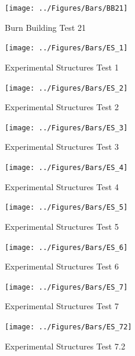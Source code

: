 \documentclass[12pt,oneside]{book}
\begin{document}
\begin{figure}[!ht]
	\texttt{[image: ../Figures/Bars/BB21]}
	\caption{Burn Building Test 21}
	\label{fig:Burn_Building_Test_21}
\end{figure}

\begin{figure}[!ht]
	\texttt{[image: ../Figures/Bars/ES\_1]}
	\caption{Experimental Structures Test 1}
	\label{fig:Experimental_Structures_Test_1}
\end{figure}

\clearpage

\begin{figure}[!ht]
	\texttt{[image: ../Figures/Bars/ES\_2]}
	\caption{Experimental Structures Test 2}
	\label{fig:Experimental_Structures_Test_2}
\end{figure}

\begin{figure}[!ht]
	\texttt{[image: ../Figures/Bars/ES\_3]}
	\caption{Experimental Structures Test 3}
	\label{fig:Experimental_Structures_Test_3}
\end{figure}

\begin{figure}[!ht]
	\texttt{[image: ../Figures/Bars/ES\_4]}
	\caption{Experimental Structures Test 4}
	\label{fig:Experimental_Structures_Test_4}
\end{figure}

\begin{figure}[!ht]
	\texttt{[image: ../Figures/Bars/ES\_5]}
	\caption{Experimental Structures Test 5}
	\label{fig:Experimental_Structures_Test_5}
\end{figure}

\clearpage

\begin{figure}[!ht]
	\texttt{[image: ../Figures/Bars/ES\_6]}
	\caption{Experimental Structures Test 6}
	\label{fig:Experimental_Structures_Test_6}
\end{figure}

\begin{figure}[!ht]
	\texttt{[image: ../Figures/Bars/ES\_7]}
	\caption{Experimental Structures Test 7}
	\label{fig:Experimental_Structures_Test_7}
\end{figure}

\begin{figure}[!ht]
	\texttt{[image: ../Figures/Bars/ES\_72]}
	\caption{Experimental Structures Test 7.2}
	\label{fig:Experimental_Structures_Test_7.2}
\end{figure}
\end{document}
